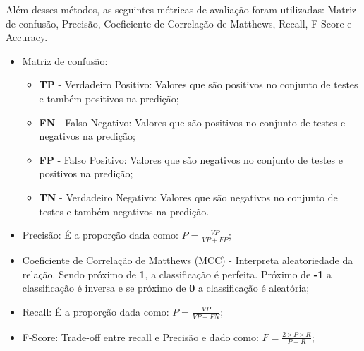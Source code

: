 Além desses métodos, as seguintes métricas de avaliação foram utilizadas: Matriz de confusão, Precisão, Coeficiente de Correlação de Matthews, Recall, F-Score e Accuracy.\\

\begin{itemize}
    \item Matriz de confusão:
          \begin{itemize}
              \item \textbf{TP} - Verdadeiro Positivo: Valores que são positivos no conjunto de testes e também positivos na predição;
              \item \textbf{FN} - Falso Negativo: Valores que são positivos no conjunto de testes e negativos na predição;
              \item \textbf{FP} - Falso Positivo: Valores que são negativos no conjunto de testes e positivos na predição;
              \item \textbf{TN} - Verdadeiro Negativo: Valores que são negativos no conjunto de testes e também negativos na predição.
          \end{itemize}
    \item Precisão: É a proporção dada como: $P = \frac{VP}{VP+FP}$;
    \item Coeficiente de Correlação de Matthews (MCC) - Interpreta aleatoriedade da relação. Sendo próximo de \textbf{1}, a classificação é perfeita. Próximo de \textbf{-1} a classificação é inversa e se próximo de \textbf{0} a classificação é aleatória;
    \item Recall: É a proporção dada como: $P = \frac{VP}{VP+FN}$;
    \item F-Score: Trade-off entre recall e Precisão e dado como: $F = \frac{2\times P\times R}{P+R}$;
\end{itemize}